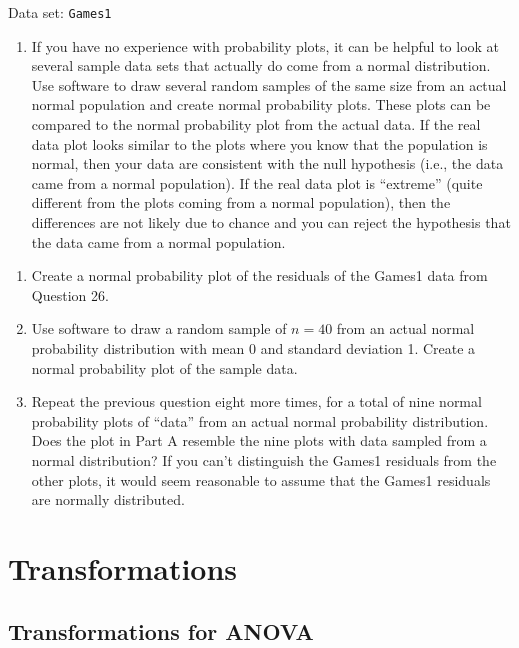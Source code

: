 \documentclass[
]{book}
\providecommand{\tightlist}{%
  \setlength{\itemsep}{0pt}\setlength{\parskip}{0pt}}
\begin{document}
Data set: \texttt{Games1}

\begin{enumerate}
\def\labelenumi{\arabic{enumi}.}
\setcounter{enumi}{29}
\tightlist
\item
  If you have no experience with probability plots, it can be helpful to look at several sample data sets that actually do come from a normal distribution. Use software to draw several random samples of the same size from an actual normal population and create normal probability plots. These plots can be compared to the normal probability plot from the actual data. If the real data plot looks similar to the plots where you know that the population is normal, then your data are consistent with the null hypothesis (i.e., the data came from a normal population). If the real data plot is ``extreme'' (quite different from the plots coming from a normal population), then the differences are not likely due to chance and you can reject the hypothesis that the data came from a normal population.
\end{enumerate}

\begin{enumerate}
\def\labelenumi{\alph{enumi}.}
\item
  Create a normal probability plot of the residuals of the Games1 data from Question 26.
\item
  Use software to draw a random sample of \(n = 40\) from an actual normal probability distribution with mean 0 and standard deviation 1. Create a normal probability plot of the sample data.
\item
  Repeat the previous question eight more times, for a total of nine normal probability plots of ``data'' from an actual normal probability distribution. Does the plot in Part A resemble the nine plots with data sampled from a normal distribution? If you can't distinguish the Games1 residuals from the other plots, it would seem reasonable to assume that the Games1 residuals are normally distributed.
\end{enumerate}

\hypertarget{transformations}{%
\section{Transformations}\label{transformations}}

\hypertarget{transformations-for-anova}{%
\subsection*{Transformations for ANOVA}\label{transformations-for-anova}}
\end{document}
